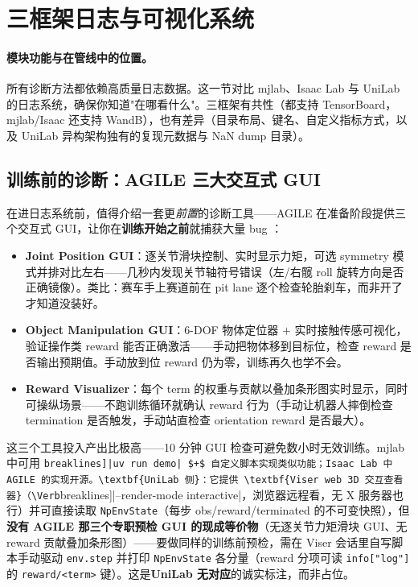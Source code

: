 \section{三框架日志与可视化系统}
\label{sec:rlmc-diag-logging}

\paragraph{模块功能与在管线中的位置。}所有诊断方法都依赖高质量日志数据。这一节对比 mjlab、Isaac Lab 与 UniLab 的日志系统，确保你知道"在哪看什么"。三框架有共性（都支持 TensorBoard，mjlab/Isaac 还支持 WandB），也有差异（目录布局、键名、自定义指标方式，以及 UniLab 异构架构独有的复现元数据与 NaN dump 目录）。

\subsection{训练前的诊断：AGILE 三大交互式 GUI}

在进日志系统前，值得介绍一套更\emph{前置}的诊断工具——AGILE 在准备阶段提供三个交互式 GUI，让你在\textbf{训练开始之前}就捕获大量 bug \cite{nvidia2026agile}：

\begin{itemize}
  \item \textbf{Joint Position GUI}：逐关节滑块控制、实时显示力矩，可选 symmetry 模式并排对比左右——几秒内发现关节轴符号错误（左/右髋 roll 旋转方向是否正确镜像）。类比：赛车手上赛道前在 pit lane 逐个检查轮胎刹车，而非开了才知道没装好。
  \item \textbf{Object Manipulation GUI}：6-DOF 物体定位器 $+$ 实时接触传感可视化，验证操作类 reward 能否正确激活——手动把物体移到目标位，检查 reward 是否输出预期值。手动放到位 reward 仍为零，训练再久也学不会。
  \item \textbf{Reward Visualizer}：每个 term 的权重与贡献以叠加条形图实时显示，同时可操纵场景——不跑训练循环就确认 reward 行为（手动让机器人摔倒检查 termination 是否触发，手动站直检查 orientation reward 是否最大）。
\end{itemize}

这三个工具投入产出比极高——10 分钟 GUI 检查可避免数小时无效训练。mjlab 中可用 \Verb[breaklines]|uv run demo| $+$ 自定义脚本实现类似功能；Isaac Lab 中 AGILE 的实现开源。\textbf{UniLab 侧}：它提供 \textbf{Viser web 3D 交互查看器}（\Verb[breaklines]|--render-mode interactive|，浏览器远程看，无 X 服务器也行）并可直接读取 \verb|NpEnvState|（每步 obs/reward/terminated 的不可变快照），但\textbf{没有 AGILE 那三个专职预检 GUI 的现成等价物}（无逐关节力矩滑块 GUI、无 reward 贡献叠加条形图）——要做同样的训练前预检，需在 Viser 会话里自写脚本手动驱动 \verb|env.step| 并打印 \verb|NpEnvState| 各分量（reward 分项可读 \verb|info["log"]| 的 \verb|reward/<term>| 键）。这是\textbf{UniLab 无对应}的诚实标注，而非占位。

